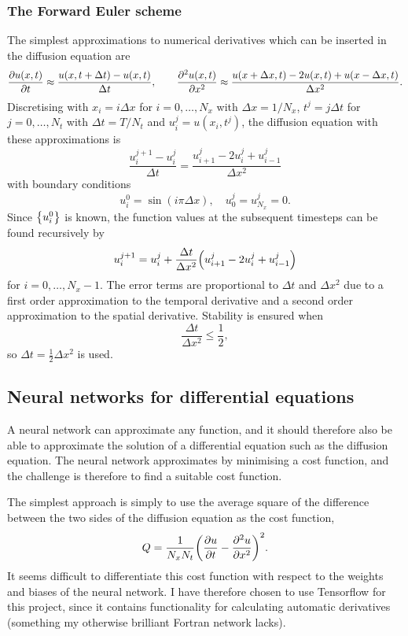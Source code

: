 \documentclass[11pt,british,a4paper]{article}
\numberwithin{equation}{section}
\begin{document}
\subsubsection{The Forward Euler scheme}
The simplest approximations to numerical derivatives which can be inserted in the diffusion equation are
\begin{equation}
    \pdv{u(x,t)}{t} \approx \frac{u(x,t+\Delta t) - u(x,t)}{\Delta t}, \qquad
    \pdv[2]{u(x,t)}{x} \approx \frac{u(x+\Delta x, t) - 2u(x,t) + u(x-\Delta x,t)}{\Delta x^2}.
\end{equation}
Discretising with \(x_i=i\Delta x\) for \(i=0,\ldots,N_x\) with \(\Delta x=1/N_x\), \(t^j=j\Delta t\) for \(j=0,\ldots,N_t\) with \(\Delta t=T/N_t\) and \(u_i^j = u(x_i,t^j)\), the diffusion equation with these approximations is
\begin{equation}
    \frac{u_i^{j+1} - u_i^j}{\Delta t} = \frac{u_{i+1}^j - 2u_i^j + u_{i-1}^j}{\Delta x^2}
\end{equation}
with boundary conditions
\begin{equation}
    u_i^0 = \sin(i\pi\Delta x),\quad
    u_0^j = u_{N_x}^j = 0.
\end{equation}
Since \(\qty{u_i^0}\) is known, the function values at the subsequent timesteps can be found recursively by
\begin{equation}
    u_i^{j+1} = u_i^j + \frac{\Delta t}{\Delta x^2} \qty(u_{i+1}^j - 2u_i^j + u_{i-1}^j)
\end{equation}
for \(i=0,\ldots,N_x-1\). The error terms are proportional to \(\Delta t\) and \(\Delta x^2\) due to a first order approximation to the temporal derivative and a second order approximation to the spatial derivative. Stability is ensured\cite{tveito} when
\begin{equation}
    \frac{\Delta t}{\Delta x^2} \leq \frac{1}{2},
\end{equation}
so \(\Delta t = \tfrac{1}{2}\Delta x^2\) is used.

\subsection{Neural networks for differential equations}
A neural network can approximate any function, and it should therefore also be able to approximate the solution of a differential equation such as the diffusion equation. The neural network approximates by minimising a cost function, and the challenge is therefore to find a suitable cost function.

The simplest approach is simply to use the average square of the difference between the two sides of the diffusion equation as the cost function,
\begin{equation}
    Q = \frac{1}{N_xN_t}\qty(\pdv{u}{t} - \pdv[2]{u}{x})^2.
\end{equation}
It seems difficult to differentiate this cost function with respect to the weights and biases of the neural network. I have therefore chosen to use Tensorflow\cite{tensorflow} for this project, since it contains functionality for calculating automatic derivatives (something my otherwise brilliant Fortran network lacks).
\end{document}
